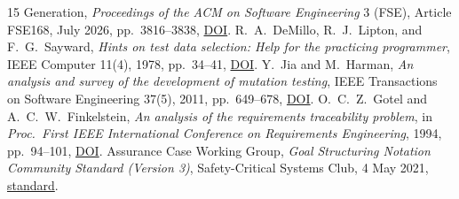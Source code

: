 \documentclass[11pt]{article}
\begin{document}
{\begin{thebibliography}{15}
{Generation}, \emph{Proceedings of the ACM on Software Engineering} 3 (FSE),
Article FSE168, July 2026, pp.~3816--3838,
\href{https://doi.org/10.1145/3808175}{DOI}.
 R.~A.~DeMillo, R.~J.~Lipton, and F.~G.~Sayward, \emph{Hints
on test data selection: Help for the practicing programmer}, IEEE Computer
11(4), 1978, pp.~34--41,
\href{https://doi.org/10.1109/C-M.1978.218136}{DOI}.
 Y.~Jia and M.~Harman, \emph{An analysis and survey of the
development of mutation testing}, IEEE Transactions on Software Engineering
37(5), 2011, pp.~649--678,
\href{https://doi.org/10.1109/TSE.2010.62}{DOI}.
 O.~C.~Z.~Gotel and A.~C.~W.~Finkelstein, \emph{An analysis
of the requirements traceability problem}, in \emph{Proc.\ First IEEE
International Conference on Requirements Engineering}, 1994, pp.~94--101,
\href{https://doi.org/10.1109/ICRE.1994.292398}{DOI}.
 Assurance Case Working Group, \emph{Goal Structuring Notation
Community Standard (Version 3)}, Safety-Critical Systems Club, 4 May 2021,
\href{https://scsc.uk/r1386.pdf}{standard}.
\end{thebibliography}
}
\end{document}
